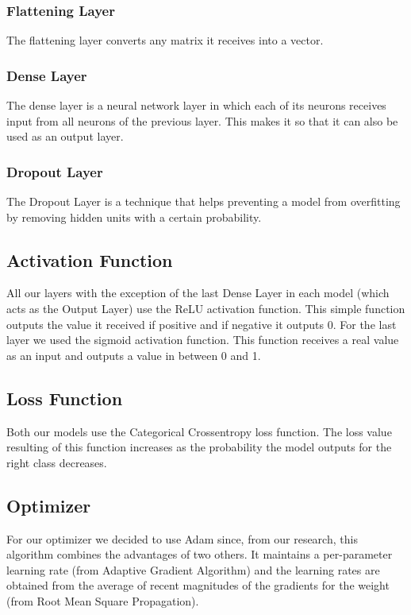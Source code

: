 \documentclass[conference]{IEEEtran}
\begin{document}
\subsubsection{Flattening Layer} The flattening layer converts any matrix it receives into a vector.

\subsubsection{Dense Layer} The dense layer is a neural network layer in which each of its neurons receives input from all neurons of the previous layer. This makes it so that it can also be used as an output layer.

\subsubsection{Dropout Layer} The Dropout Layer is a technique that helps preventing a model from overfitting by removing hidden units with a certain probability.

\subsection{Activation Function \cite{L} \cite{O}} All our layers with the exception of the last Dense Layer in each model (which acts as the Output Layer) use the ReLU activation function. This simple function outputs the value it received if positive and if negative it outputs 0. For the last layer we used the sigmoid activation function. This function receives a real value as an input and outputs a value in between 0 and 1.

\subsection{Loss Function \cite{Q}} Both our models use the Categorical Crossentropy loss function. The loss value resulting of this function increases as the probability the model outputs for the right class decreases.

\subsection{Optimizer \cite{R}} For our optimizer we decided to use Adam since, from our research, this algorithm combines the advantages of two others. It maintains a per-parameter learning rate (from Adaptive Gradient Algorithm) and the learning rates are obtained from the average of recent magnitudes of the gradients for the weight (from Root Mean Square Propagation).
\end{document}
